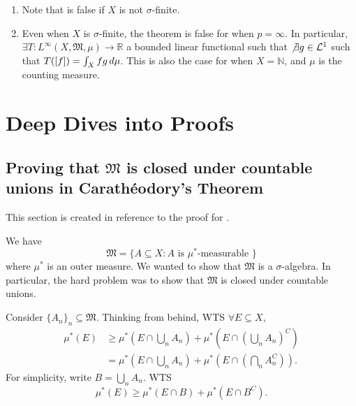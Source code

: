 \documentclass[notoc,notitlepage]{tufte-book}
\begin{document}
\begin{remark}
  \begin{enumerate}
    \item Note that  is false
      if $X$ is not $\sigma$-finite.
    \item Even when $X$ is $\sigma$-finite, the theorem is false
      for when $p = \infty$.
      In particular, $\exists T : L^{\infty}(X, \mathfrak{M}, \mu) \to \mathbb{R}$
      a bounded linear functional such that $\not\exists g \in \mathcal{L}^1$
      such that $T([f]) = \int_{X} fg \mathop{}\!d{\mu}$.
      This is also the case for when $X = \mathbb{N}$,
      and $\mu$ is the counting measure.
  \end{enumerate}
\end{remark}



\appendix

\chapter{Deep Dives into Proofs}%
\label{chp:deep_dives_into_proofs}

\section{Proving that \texorpdfstring{$\mathfrak{M}$}{M} is closed under countable unions in Carath\'{e}odory's Theorem}\label{sec:proving_that_m_is_closed_under_countable_unions_in_caratheodory_s_theorem}

This section is created in reference to
the proof for .

We have
\begin{equation*}
  \mathfrak{M} = \{ A \subseteq X : A \text{ is } \mu^*\text{-measurable } \}
\end{equation*}
where $\mu^*$ is an outer measure.
We wanted to show that $\mathfrak{M}$ is a $\sigma$-algebra.
In particular, the hard problem was to show that
$\mathfrak{M}$ is closed under countable unions.

Consider $\{ A_n \}_{n} \subseteq \mathfrak{M}$.
Thinking from behind, WTS $\forall E \subseteq X$,
\begin{align*}
  \mu^*(E)
  &\geq \mu^* \left( E \cap \bigcup_{n} A_n \right)
    + \mu^* \left( E \cap \left( \bigcup_{n} A_n \right)^C \right) \\
  &= \mu^* \left( E \cap \bigcup_{n} A_n \right)
    + \mu^* \left( E \cap \left( \bigcap_{n} A_n^C \right) \right).
\end{align*}
For simplicity, write $B = \bigcup_{n} A_n$.
WTS
\begin{equation}\tag{$*$}\label{eq:appendix_1_eq_1}
  \mu^*(E) \geq \mu^*(E \cap B) + \mu^*(E \cap B^C).
\end{equation}
\end{document}
